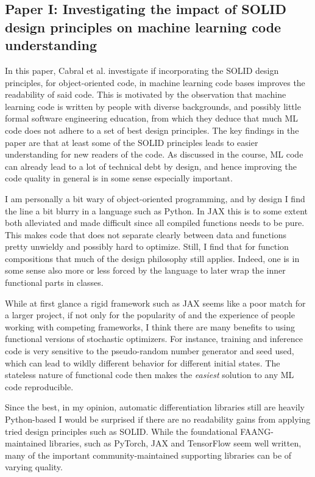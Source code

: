 \documentclass[11pt]{diazessay}
\begin{document}
\subsection*{Paper I: Investigating the impact of SOLID design principles on machine learning code understanding\cite{cabral2024investigating}}

In this paper, Cabral et al. investigate if incorporating the SOLID design principles, for object-oriented code, in machine learning code bases improves the readability of said code. This is motivated by the observation that machine learning code is written by people with diverse backgrounds, and possibly little formal software engineering education, from which they deduce that much ML code does not adhere to a set of best design principles. The key findings in the paper are that at least some of the SOLID principles leads to easier understanding for new readers of the code. As discussed in the course, ML code can already lead to a lot of technical debt by design, and hence improving the code quality in general is in some sense especially important.

I am personally a bit wary of object-oriented programming, and by design I find the line a bit blurry in a language such as Python. In JAX this is to some extent both alleviated and made difficult since all compiled functions needs to be pure. This makes code that does not separate clearly between data and functions pretty unwieldy and possibly hard to optimize. Still, I find that for function compositions that much of the design philosophy still applies. Indeed, one is in some sense also more or less forced by the language to later wrap the inner functional parts in classes.

While at first glance a rigid framework such as JAX seems like a poor match for a larger project, if not only for the popularity of and the experience of people working with competing frameworks, I think there are many benefits to using functional versions of stochastic optimizers. For instance, training and inference code is very sensitive to the pseudo-random number generator and seed used, which can lead to wildly different behavior for different initial states. The stateless nature of functional code then makes the \textit{easiest} solution to any ML code reproducible.

Since the best, in my opinion, automatic differentiation libraries still are heavily Python-based I would be surprised if there are no readability gains from applying tried design principles such as SOLID. While the foundational FAANG-maintained libraries, such as PyTorch, JAX and TensorFlow seem well written, many of the important community-maintained supporting libraries can be of varying quality.
\end{document}
